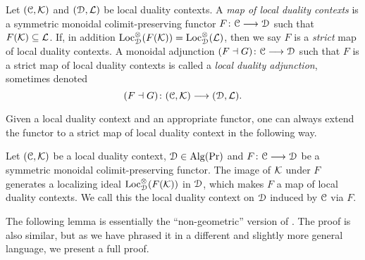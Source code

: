 \begin{definition}
    Let $(\EuScript{C}, \mathcal{K})$ and $(\EuScript{D}, \mathcal{L})$ be local duality contexts. A \emph{map of local duality contexts} is a symmetric monoidal colimit-preserving functor $F\colon \EuScript{C}\longrightarrow \EuScript{D}$ such that $F(\mathcal{K})\subseteq \mathcal{L}$. If, in addition $\operatorname{Loc}_{\EuScript{D}}^\otimes(F(\mathcal{K})) = \operatorname{Loc}_{\EuScript{D}}^\otimes(\mathcal{L})$, then we say $F$ is a \emph{strict} map of local duality contexts. A monoidal adjunction $(F\dashv G)\colon \EuScript{C}\longrightarrow \EuScript{D}$ such that $F$ is a strict map of local duality contexts is called a \emph{local duality adjunction}, sometimes denoted 
    $$(F\dashv G)\colon (\EuScript{C}, \mathcal{K})\longrightarrow (\EuScript{D}, \mathcal{L}).$$
\end{definition}

Given a local duality context and an appropriate functor, one can always extend the functor to a strict map of local duality context in the following way. 

\begin{construction}
    Let $(\EuScript{C}, \mathcal{K})$ be a local duality context, $\EuScript{D} \in \operatorname{Alg}(\Pr)$ and $F\colon \EuScript{C}\longrightarrow \EuScript{D}$ be a symmetric monoidal colimit-preserving functor. The image of $\mathcal{K}$ under $F$ generates a localizing ideal $\operatorname{Loc}^\otimes_{\EuScript{D}}(F(\mathcal{K}))$ in $\EuScript{D}$, which makes $F$ a map of local duality contexts. We call this the local duality context on $\EuScript{D}$ induced by $\EuScript{C}$ via $F$. 
\end{construction}

The following lemma is essentially the ``non-geometric'' version of \cite[5.11]{balmer-sanders_2017}. The proof is also similar, but as we have phrased it in a different and slightly more general language, we present a full proof. 

